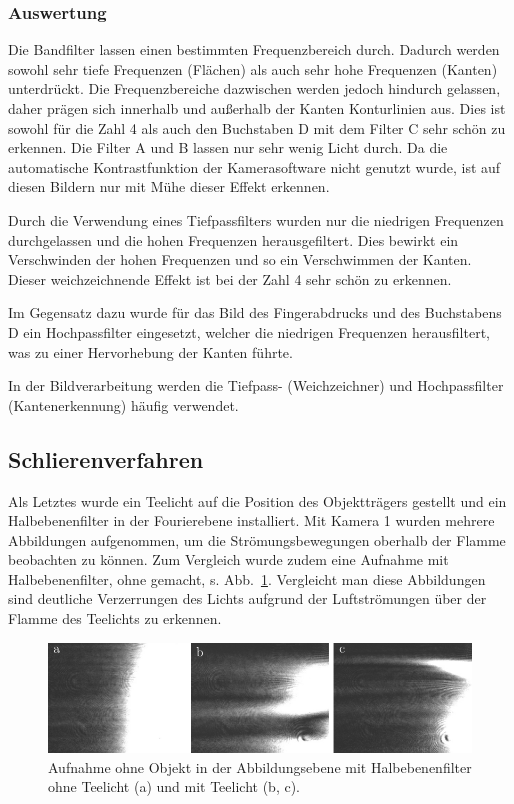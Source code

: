 \subsubsection*{Auswertung}

Die Bandfilter lassen einen bestimmten Frequenzbereich durch. Dadurch werden sowohl sehr tiefe Frequenzen (Flächen) als auch sehr hohe Frequenzen (Kanten) unterdrückt. Die Frequenzbereiche dazwischen werden jedoch hindurch gelassen, daher prägen sich innerhalb und außerhalb der Kanten Konturlinien aus. Dies ist sowohl für die Zahl 4 als auch den Buchstaben D mit dem Filter C sehr schön zu erkennen. Die Filter A und B lassen nur sehr wenig Licht durch. Da die automatische Kontrastfunktion der Kamerasoftware nicht genutzt wurde, ist auf diesen Bildern nur mit Mühe dieser Effekt erkennen.

Durch die Verwendung eines Tiefpassfilters wurden nur die niedrigen Frequenzen durchgelassen und die hohen Frequenzen herausgefiltert. Dies bewirkt ein Verschwinden der hohen Frequenzen und so ein Verschwimmen der Kanten. Dieser weichzeichnende Effekt ist bei der Zahl 4 sehr schön zu erkennen.

Im Gegensatz dazu wurde für das Bild des Fingerabdrucks und des Buchstabens D ein Hochpassfilter eingesetzt, welcher die niedrigen Frequenzen herausfiltert, was zu einer Hervorhebung der Kanten führte.

In der Bildverarbeitung werden die Tiefpass- (Weichzeichner) und Hochpassfilter (Kantenerkennung) häufig verwendet.


\subsection{Schlierenverfahren}
Als Letztes wurde ein Teelicht auf die Position des Objektträgers gestellt und ein Halbebenenfilter in der Fourierebene installiert. Mit Kamera 1 wurden mehrere Abbildungen aufgenommen, um die Strömungsbewegungen oberhalb der Flamme beobachten zu können. Zum Vergleich wurde zudem eine Aufnahme mit Halbebenenfilter, ohne gemacht, s. Abb.~\ref{fig:Halbebenenfilter_mit_und_ohne_Teelicht}. Vergleicht man diese Abbildungen sind deutliche Verzerrungen des Lichts aufgrund der Luftströmungen über der Flamme des Teelichts zu erkennen. 

\begin{figure}[h]
	\centering
	\includegraphics{images/ergebniss_Teelicht/abb.pdf}
	\caption[Sichtbar gemachte Schlieren]{
		Aufnahme ohne Objekt in der Abbildungsebene mit Halbebenenfilter ohne Teelicht (a) und mit Teelicht (b, c).
	}
	\label{fig:Halbebenenfilter_mit_und_ohne_Teelicht}
\end{figure}


